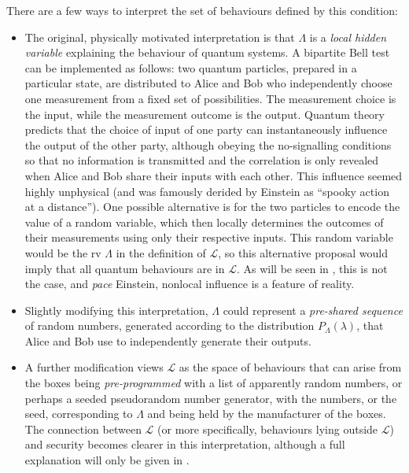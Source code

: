 \documentclass[10pt, a4paper]{article}
\numberwithin{equation}{section} %
\theoremstyle{definition}
\theoremstyle{plain}
\newcommand{\?}{\mathrel{?}} %
\newcommand{\Ls}{\mathcal{L}}
\begin{document}
    There are a few ways to interpret the set of behaviours defined by this condition:
    \begin{itemize}
      \item The original, physically motivated interpretation is that \(\Lambda\) is a \emph{local hidden variable} explaining the behaviour of quantum systems. A bipartite Bell test can be implemented as follows: two quantum particles, prepared in a particular state, are distributed to Alice and Bob who independently choose one measurement from a fixed set of possibilities. The measurement choice is the input, while the measurement outcome is the output. Quantum theory predicts that the choice of input of one party can instantaneously influence the output of the other party, although obeying the no-signalling conditions so that no information is transmitted and the correlation is only revealed when Alice and Bob share their inputs with each other. This influence seemed highly unphysical (and was famously derided by Einstein as ``spooky action at a distance''). One possible alternative is for the two particles to encode the value of a random variable, which then locally determines the outcomes of their measurements using only their respective inputs. This random variable would be the rv \(\Lambda\) in the definition of \(\Ls\), so this alternative proposal would imply that all quantum behaviours are in \(\Ls\). As will be seen in , this is not the case, and \emph{pace} Einstein, nonlocal influence is a feature of reality.
      \item Slightly modifying this interpretation, \(\Lambda\) could represent a \emph{pre-shared sequence} of random numbers, generated according to the distribution \(P_{\Lambda}(\lambda)\), that Alice and Bob use to independently generate their outputs.
      \item A further modification views \(\Ls\) as the space of behaviours that can arise from the boxes being \emph{pre-programmed} with a list of apparently random numbers, or perhaps a seeded pseudorandom number generator, with the numbers, or the seed, corresponding to \(\Lambda\) and being held by the manufacturer of the boxes. The connection between \(\Ls\) (or more specifically, behaviours lying outside \(\Ls\)) and security becomes clearer in this interpretation, although a full explanation will only be given in .
    \end{itemize}
\end{document}
